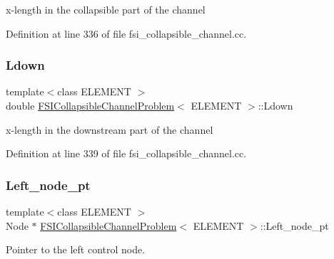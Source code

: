 x-\/length in the collapsible part of the channel 



Definition at line 336 of file fsi\+\_\+collapsible\+\_\+channel.\+cc.

\mbox{\label{classFSICollapsibleChannelProblem_a0964686847cc64f2a77a866187aec626}} 
\subsubsection{\texorpdfstring{Ldown}{Ldown}}
{\footnotesize\ttfamily template$<$class E\+L\+E\+M\+E\+NT $>$ \\
double \hyperlink{classFSICollapsibleChannelProblem}{F\+S\+I\+Collapsible\+Channel\+Problem}$<$ E\+L\+E\+M\+E\+NT $>$\+::Ldown\hspace{0.3cm}{\ttfamily [private]}}



x-\/length in the downstream part of the channel 



Definition at line 339 of file fsi\+\_\+collapsible\+\_\+channel.\+cc.

\mbox{\label{classFSICollapsibleChannelProblem_a0e5fd455e2956e74485678d4357b4869}} 
\subsubsection{\texorpdfstring{Left\+\_\+node\+\_\+pt}{Left\_node\_pt}}
{\footnotesize\ttfamily template$<$class E\+L\+E\+M\+E\+NT $>$ \\
Node $\ast$ \hyperlink{classFSICollapsibleChannelProblem}{F\+S\+I\+Collapsible\+Channel\+Problem}$<$ E\+L\+E\+M\+E\+NT $>$\+::Left\+\_\+node\+\_\+pt\hspace{0.3cm}{\ttfamily [private]}}



Pointer to the left control node. 



